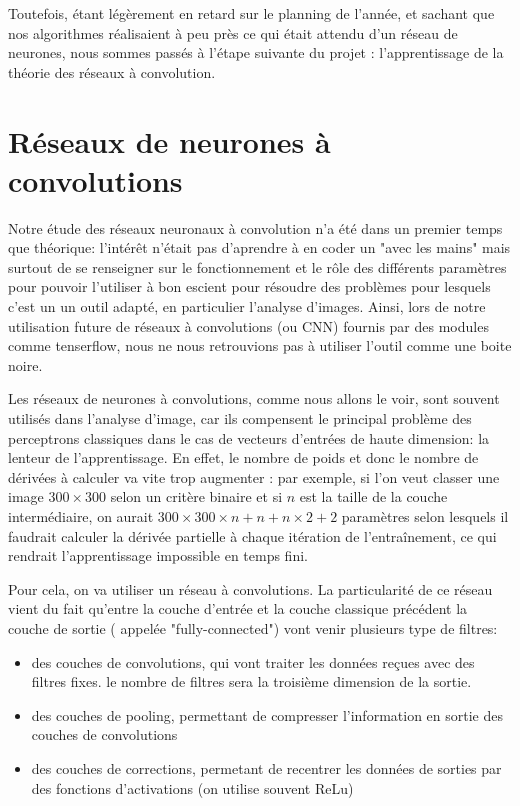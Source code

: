 \documentclass[
    10pt,
    a4paper,
    oneside,
    headinclude,footinclude,
    BCOR=5mm,
    captions=tableabove
]{scrartcl}
\begin{document}
Toutefois, étant légèrement en retard sur le planning de l'année, et sachant que nos algorithmes réalisaient à peu près ce qui était attendu d'un réseau de neurones, nous sommes passés à l'étape suivante du projet : l'apprentissage de la théorie des réseaux à convolution.

\section{Réseaux de neurones à convolutions}


Notre étude des réseaux neuronaux à convolution n'a été dans un premier temps que théorique: l'intérêt n'était pas d'aprendre à en coder un "avec les mains" mais surtout de se renseigner sur le fonctionnement et le rôle des différents paramètres pour pouvoir l'utiliser à bon escient pour résoudre des problèmes pour lesquels c'est un un outil adapté, en particulier l'analyse d'images. Ainsi, lors de notre utilisation future de réseaux à convolutions (ou CNN) fournis par des modules comme tenserflow, nous ne nous retrouvions pas à utiliser l'outil comme une boite noire.

Les réseaux de neurones à convolutions, comme nous allons le voir, sont souvent utilisés dans l'analyse d'image, car ils compensent le principal problème des perceptrons classiques dans le cas de vecteurs d'entrées de haute dimension: la lenteur de l'apprentissage. En effet, le nombre de poids et donc le nombre de dérivées à calculer va vite trop augmenter : par exemple, si l'on veut classer une image $300\times300$ selon un critère binaire et si $n$ est la taille de la couche intermédiaire, on aurait 
$300\times 300 \times n + n + n\times 2 +2$ paramètres selon lesquels il faudrait calculer la dérivée partielle à chaque itération de l'entraînement, ce qui rendrait l'apprentissage impossible en temps fini. 

Pour cela, on va utiliser un réseau à convolutions. La particularité de ce réseau vient du fait qu'entre la couche d'entrée et la couche classique précédent la couche de sortie ( appelée "fully-connected") vont venir plusieurs type de filtres:
\begin{itemize}
	\item des couches de convolutions, qui vont traiter les données reçues avec des filtres fixes. le nombre de filtres sera la troisième dimension de la sortie.
	\item des couches de pooling, permettant de compresser l'information en sortie des couches de convolutions
	\item des couches de corrections, permetant de recentrer les données de sorties par des fonctions d'activations (on utilise souvent ReLu)
\end{itemize}
\end{document}
